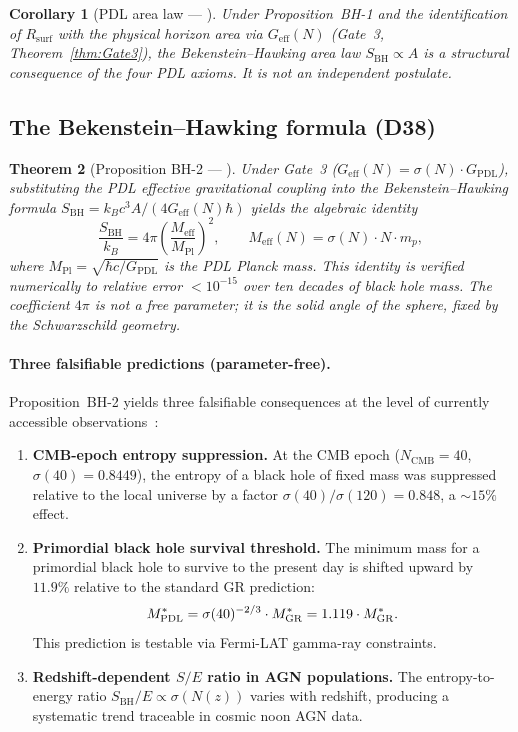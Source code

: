 \documentclass[11pt,a4paper]{article}
\theoremstyle{plain}
\newtheorem{theorem}{Theorem}[section]
\newtheorem{corollary}[theorem]{Corollary}
\theoremstyle{definition}
\theoremstyle{remark}
\newcommand{\PDL}{\textnormal{PDL}}
\newcommand{\Geff}{G_{\mathrm{eff}}}
\newcommand{\GPDL}{G_{\mathrm{PDL}}}
\newcommand{\Rsurf}{R_{\mathrm{surf}}}
\newcommand{\sigmaN}{\sigma(N)}
\newcommand{\SBH}{S_{\mathrm{BH}}}
\newcommand{\Meff}{M_{\mathrm{eff}}}
\newcommand{\MPl}{M_{\mathrm{Pl}}}
\begin{document}
\begin{corollary}[PDL area law — \citep{D37}]
\label{cor:area_law}
Under Proposition~BH-1 and the identification of $\Rsurf$ with the physical horizon area via $\Geff(N)$ (Gate~3, Theorem~\ref{thm:Gate3}), the Bekenstein--Hawking area law $\SBH \propto A$ is a structural consequence of the four PDL axioms.
It is not an independent postulate.
\end{corollary}

\subsection{The Bekenstein--Hawking formula (D38)}
\label{subsec:bh_formula}

\begin{theorem}[Proposition BH-2 — \citep{D38}]
\label{thm:BH2}
Under Gate~3 ($\Geff(N)=\sigmaN\cdot\GPDL$), substituting the PDL effective gravitational coupling into the Bekenstein--Hawking formula $\SBH = k_B c^3 A/(4\Geff(N)\hbar)$ yields the algebraic identity
\[
\frac{\SBH}{k_B} = 4\pi\left(\frac{\Meff}{\MPl}\right)^2,
\qquad
\Meff(N) = \sigma(N)\cdot N\cdot m_p,
\]
where $\MPl = \sqrt{\hbar c/\GPDL}$ is the PDL Planck mass.
This identity is verified numerically to relative error $<10^{-15}$ over ten decades of black hole mass.
The coefficient $4\pi$ is not a free parameter; it is the solid angle of the sphere, fixed by the Schwarzschild geometry.
\end{theorem}

\paragraph{Three falsifiable predictions (parameter-free).}
Proposition~BH-2 yields three falsifiable consequences at the level of currently accessible observations~\citep{D38}:
\begin{enumerate}
\item \textbf{CMB-epoch entropy suppression.} At the CMB epoch ($N_{\mathrm{CMB}}=40$, $\sigma(40)=0.8449$), the entropy of a black hole of fixed mass was suppressed relative to the local universe by a factor $\sigma(40)/\sigma(120)=0.848$, a $\sim 15\%$ effect.
\item \textbf{Primordial black hole survival threshold.} The minimum mass for a primordial black hole to survive to the present day is shifted upward by $11.9\%$ relative to the standard GR prediction:
\[
M^*_{\PDL} = \sigma(40)^{-2/3}\cdot M^*_{\mathrm{GR}} = 1.119\cdot M^*_{\mathrm{GR}}.
\]
This prediction is testable via Fermi-LAT gamma-ray constraints.
\item \textbf{Redshift-dependent $S/E$ ratio in AGN populations.} The entropy-to-energy ratio $\SBH/E \propto \sigma(N(z))$ varies with redshift, producing a systematic trend traceable in cosmic noon AGN data.
\end{enumerate}
\end{document}
